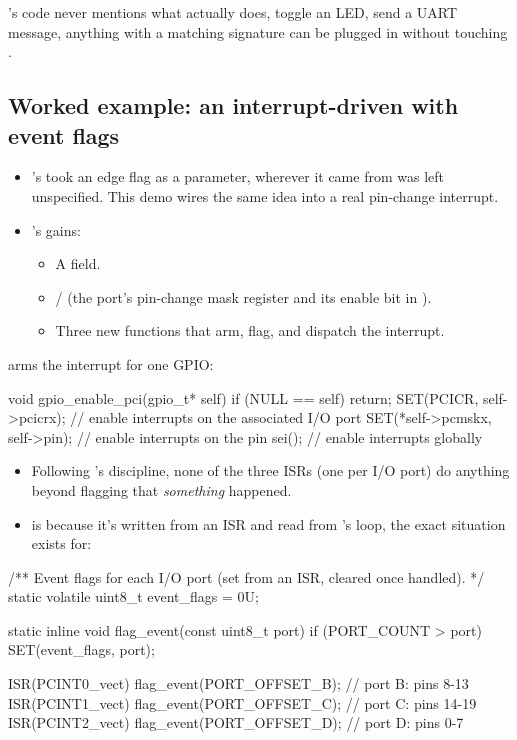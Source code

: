 \noindent{}'s code never mentions what  actually does, toggle an LED,
send a UART message, anything with a matching signature can be plugged in without touching
.

\subsection{Worked example: an interrupt-driven  with event flags}
\label{c10:a:5}
\begin{itemize}
  \item {}'s  took an edge flag as a parameter, wherever it came from
    was left unspecified. This demo wires the same idea into a real pin-change interrupt.
  \item {}'s  gains:
  \begin{itemize}
    \item A  field.
    \item {}/ (the port's pin-change mask register and its enable bit in
      ).
    \item Three new functions that arm, flag, and dispatch the interrupt.
  \end{itemize}
\end{itemize}
 arms the interrupt for one GPIO:

\begin{ccode}
void gpio_enable_pci(gpio_t* self)
{
    if (NULL == self) { return; }
    SET(PCICR, self->pcicrx);      // enable interrupts on the associated I/O port
    SET(*self->pcmskx, self->pin); // enable interrupts on the pin
    sei();                         // enable interrupts globally
}
\end{ccode}

\begin{itemize}
  \item Following 's discipline, none of the three ISRs (one per I/O port) do
    anything beyond flagging that \emph{something} happened.
  \item {} is  because it's written from an ISR and read from
    's loop, the exact situation  exists for:
\end{itemize}

\begin{ccode}
/** Event flags for each I/O port (set from an ISR, cleared once handled). */
static volatile uint8_t event_flags = 0U;

static inline void flag_event(const uint8_t port)
{
    if (PORT_COUNT > port) { SET(event_flags, port); }
}

ISR(PCINT0_vect) { flag_event(PORT_OFFSET_B); } // port B: pins 8-13
ISR(PCINT1_vect) { flag_event(PORT_OFFSET_C); } // port C: pins 14-19
ISR(PCINT2_vect) { flag_event(PORT_OFFSET_D); } // port D: pins 0-7
\end{ccode}

